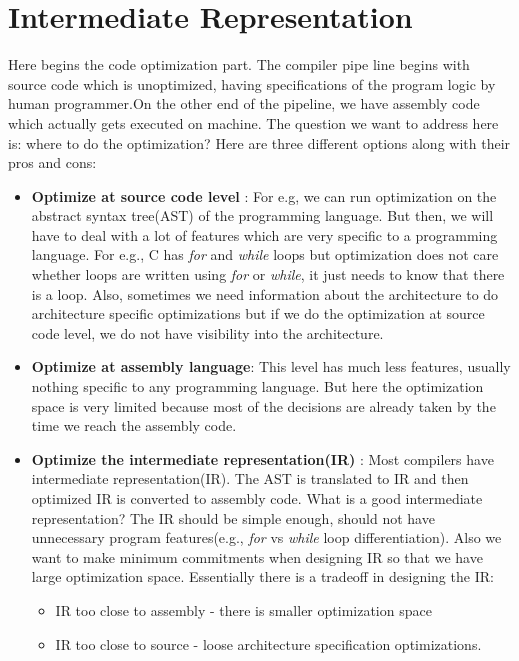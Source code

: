 \section{Intermediate Representation}

Here begins the code optimization part. The compiler pipe line begins with source code which is unoptimized, having specifications of the program logic by human programmer.On the other end of the pipeline, we have assembly code which actually gets executed on machine. The question we want to address here is: where to do the optimization? Here are three different options along with their pros and cons:


\begin{itemize}
    \item \textbf{Optimize at source code level} : For e.g, we can run optimization on  the abstract syntax tree(AST) of the programming language. But then, we will have to deal with a lot of features which are very specific to a programming language. For e.g., C has \emph{for} and \emph{while} loops but optimization does not care whether loops are written using \emph{for} or \emph{while}, it just needs to know that there is a loop.
    Also, sometimes we need information about the architecture to do architecture specific optimizations but if we do the optimization at source code level, we do not have visibility into the architecture. 
    \item \textbf{Optimize at assembly language}: This level has much less features, usually nothing specific to any programming language. But here the optimization space is very limited because most of the decisions are already taken by the time we reach the assembly code. 
    \item \textbf{Optimize the intermediate representation(IR)} : Most compilers have intermediate representation(IR). The AST is translated to IR and then optimized IR is converted to assembly code. 
    What is a good intermediate representation? The IR should be simple enough, should not have unnecessary program features(e.g., \emph{for} vs \emph{while} loop differentiation). Also we want to make minimum commitments when designing IR so that we have large optimization space.
    Essentially there is a tradeoff in designing the IR:
    \begin{itemize}
        \item IR too close to assembly - there is smaller optimization space
        \item IR too close to source - loose architecture specification optimizations.
    \end{itemize}
    
\end{itemize}

